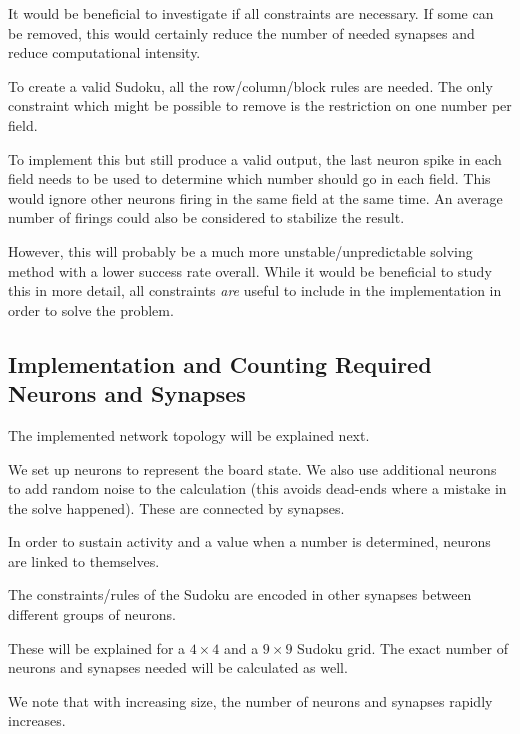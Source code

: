 It would be beneficial to investigate if all constraints are necessary. If some can be removed, this would certainly reduce the number of needed synapses and reduce computational intensity.

To create a valid Sudoku, all the row/column/block rules are needed. The only constraint which might be possible to remove is the restriction on one number per field.

To implement this but still produce a valid output, the last neuron spike in each field needs to be used to determine which number should go in each field. This would ignore other neurons firing in the same field at the same time. An average number of firings could also be considered to stabilize the result.

However, this will probably be a much more unstable/unpredictable solving method with a lower success rate overall. While it would be beneficial to study this in more detail, all constraints \emph{are} useful to include in the implementation in order to solve the problem.

\subsection{Implementation and Counting Required Neurons and Synapses}
\label{sec:sudoku_counting_neurons}

The implemented network topology will be explained next.

We set up neurons to represent the board state. We also use additional neurons to add random noise to the calculation (this avoids dead-ends where a mistake in the solve happened). These are connected by synapses.

In order to sustain activity and  a value when a number is determined, neurons are linked to themselves.

The constraints/rules of the Sudoku are encoded in other synapses between different groups of neurons.

These will be explained for a \( 4 \times 4 \) and a \( 9 \times 9 \) Sudoku grid. The exact number of neurons and synapses needed will be calculated as well.

We note that with increasing size, the number of neurons and synapses rapidly increases.




